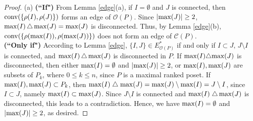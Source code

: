 \documentclass[12pt]{amsart}
\theoremstyle{definition}
\begin{document}
\begin{proof}
(a)
{\bf (``If")}
From Lemma \ref{edge}(a), if $I = \emptyset$ and $J$ is connected, then ${\rm conv}(\{\rho(I),\rho(J)\})$ forms an edge of $\mathcal{O}(P)$.
Since $|{\rm max}(J)| \geq 2$, ${\rm max}(I)\,\triangle\,{\rm max}(J)={\rm max}(J)$ is disconnected.
Thus, by Lemma \ref{edge}(b), ${\rm conv}(\{\rho({\rm max}(I)),\rho({\rm max}(J))\})$ does not form an edge of $\mathcal{C}(P)$.
\\
{\bf (``Only if")}
According to Lemma \ref{edge}, $\{I, J\} \in E^{*}_{\mathcal{O}(P)}$ if and only if $I \subset J$, $J \setminus I$ is connected, and ${\rm max}(I)\,\triangle\,{\rm max}(J)$ is disconnected in $P$.
If ${\rm max}(I)\triangle{\rm max}(J)$ is disconnected, then  either ${\rm max}(I)=\emptyset$ and $|{\rm max}(J)| \geq 2$, or ${\rm max}(I),{\rm max}(J)$ are subsets of $P_k$, where $0 \leq k \leq n$, since $P$ is a maximal ranked poset.
If ${\rm max}(I),{\rm max}(J) \subset P_k$, then 
$
{\rm max}(I)\;\triangle\;{\rm max}(J)
=
{\rm max}(J)\setminus{\rm max}(I)
=
J \setminus I$,
since $I \subset J$, namely ${\rm max}(I)\subset{\rm max}(J)$.
Since $J \setminus I$ is connected and ${\rm max}(I)\;\triangle\,{\rm max}(J)$ is disconnected, this leads to a contradiction.
Hence, we have ${\rm max}(I)=\emptyset$ and $|{\rm max}(J)| \geq 2$, as desired. 


\end{proof}
\end{document}
